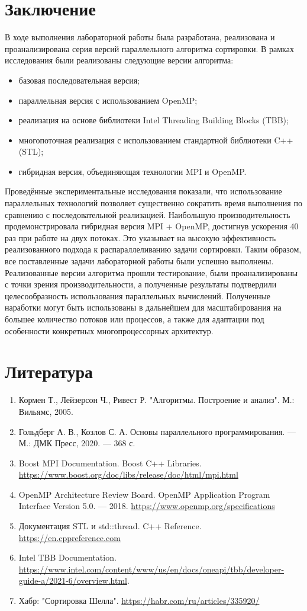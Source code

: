 \documentclass[a4paper,12pt]{article}
\begin{document}
\section{Заключение}
В ходе выполнения лабораторной работы была разработана, реализована и проанализирована серия версий параллельного алгоритма сортировки. В рамках исследования были реализованы следующие версии алгоритма:
\begin{itemize}
    \item базовая последовательная версия;
    \item параллельная версия с использованием OpenMP;
    \item реализация на основе библиотеки Intel Threading Building Blocks (TBB);
    \item многопоточная реализация с использованием стандартной библиотеки C++ (STL);
    \item гибридная версия, объединяющая технологии MPI и OpenMP.
\end{itemize}
Проведённые экспериментальные исследования показали, что использование параллельных технологий позволяет существенно сократить время выполнения по сравнению с последовательной реализацией. Наибольшую производительность продемонстрировала гибридная версия MPI + OpenMP, достигнув ускорения 40 раз при работе на двух потоках. Это указывает на высокую эффективность реализованного подхода к распараллеливанию задачи сортировки.
Таким образом, все поставленные задачи лабораторной работы были успешно выполнены. Реализованные версии алгоритма прошли тестирование, были проанализированы с точки зрения производительности, а полученные результаты подтвердили целесообразность использования параллельных вычислений. Полученные наработки могут быть использованы в дальнейшем для масштабирования на большее количество потоков или процессов, а также для адаптации под особенности конкретных многопроцессорных архитектур.
\newpage

\section{Литература}
\begin{enumerate}
    \item Кормен Т., Лейзерсон Ч., Ривест Р. "Алгоритмы. Построение и анализ". М.: Вильямс, 2005.
    \item Гольдберг А. В., Козлов С. А. Основы параллельного программирования. — М.: ДМК Пресс, 2020. — 368 с.
    \item Boost MPI Documentation. Boost C++ Libraries.  \url{https://www.boost.org/doc/libs/release/doc/html/mpi.html}
\item OpenMP Architecture Review Board. OpenMP Application Program Interface Version 5.0. — 2018. \url{https://www.openmp.org/specifications}
    \item Документация STL и std::thread. C++ Reference.  \url{https://en.cppreference.com}
    \item Intel TBB Documentation. \url{https://www.intel.com/content/www/us/en/docs/oneapi/tbb/developer-guide-a/2021-6/overview.html}.
    \item Хабр: "Сортировка Шелла". \url{https://habr.com/ru/articles/335920/}
\end{enumerate}
\newpage
\end{document}
